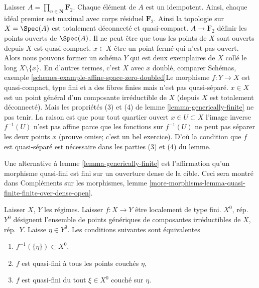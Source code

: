 \begin{example}

\label{example-counter-generically-finite}

Laisser $A = \prod_{n \in \mathbf{N}} \mathbf{F}_2$. Chaque élément de $A$ est un idempotent. Ainsi, chaque idéal premier est maximal avec corps résiduel $\mathbf{F}_2$. Ainsi la topologie sur $X = \Spec(A)$ est totalement déconnecté et quasi-compact. $A \to \mathbf{F}_2$ définir les points ouverts de $\Spec(A)$. Il ne peut être que tous les points de $X$ sont ouverts depuis $X$ est quasi-compact. $x \in X$ être un point fermé qui n'est pas ouvert. Alors nous pouvons former un schéma $Y$ qui est deux exemplaires de $X$ collé le long $X \setminus \{x\}$. En d'autres termes, c'est $X$ avec $x$ doublé, comparer Schémas, exemple \ref{schemes-example-affine-space-zero-doubled}Le morphisme
$f : Y \to X$ est quasi-compact, type fini et a des fibres finies mais n'est pas quasi-séparé. $x \in X$ est un point général d'un composante irréductible de $X$ (depuis $X$ est totalement déconnecté). Mais les propriétés (3) et (4) de lemme \ref{lemma-generically-finite} ne pas tenir. La raison est que pour tout quartier ouvert $x \in U \subset X$ l'image inverse
$f^{-1}(U)$ n'est pas affine parce que les fonctions sur $f^{-1}(U)$ ne peut pas séparer les deux points $x$ (prouve omise; c'est un bel exercice). D'où la condition que $f$ est quasi-séparé est nécessaire dans les parties (3) et (4) du lemme.

\end{example}

\begin{remark}

\label{remark-quasi-finite-finite-over-dense-open}
Une alternative à lemme \ref{lemma-generically-finite} est l'affirmation qu'un morphisme quasi-fini est fini sur un ouverture dense de la cible. Ceci sera montré dans Compléments sur les morphismes, lemme \ref{more-morphisms-lemma-quasi-finite-finite-over-dense-open}.
\end{remark}

\begin{lemma}

\label{lemma-quasi-finiteness-over-generic-point}

Laisser $X$, $Y$ les régimes. Laisser $f : X \to Y$ être localement de type fini. $X^0$, rép.\ $Y^0$ désignent l'ensemble de points génériques de composantes irréductibles de $X$, rép.\ $Y$. Laisse $\eta \in Y^0$. Les conditions suivantes sont équivalentes

\begin{enumerate}

\item  $f^{-1}(\{\eta\}) \subset X^0$,
\item  $f$ est quasi-fini à tous les points couchés $\eta$,
\item  $f$ est quasi-fini du tout $\xi \in X^0$ couché sur $\eta$.

\end{enumerate}

\end{lemma}

